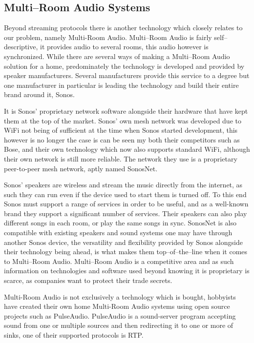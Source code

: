 \subsection{Multi--Room Audio Systems}
Beyond streaming protocols there is another technology which closely relates to our problem, namely Multi-Room Audio.
Multi--Room Audio is fairly self--descriptive, it provides audio to several rooms, this audio however is synchronized.
While there are several ways of making a Multi--Room Audio solution for a home, predominately the technology is developed and provided by speaker manufacturers.
Several manufacturers provide this service to a degree but one manufacturer in particular is leading the technology and build their entire brand around it, Sonos.

It is Sonos' proprietary network software alongside their hardware that have kept them at the top of the market.
Sonos' own mesh network was developed due to WiFi not being of sufficient at the time when Sonos started development, this however is no longer the case is can be seen my both their competitors such as Bose, and their own technology which now also supports standard WiFi, although their own network is still more reliable.\cite{sonos1} %
The network they use is a proprietary peer-to-peer mesh network, aptly named SonosNet.\cite{sonosWiki} %

Sonos' speakers are wireless and stream the music directly from the internet, as such they can run even if the device used to start them is turned off.
To this end Sonos must support a range of services in order to be useful, and as a well-known brand they support a significant number of services.
Their speakers can also play different songs in each room, or play the same songs in sync.
SonosNet is also compatible with existing speakers and sound systems one may have through another Sonos device, the versatility and flexibility provided by Sonos alongside their technology being ahead, is what makes them top--of--the--line when it comes to Multi--Room Audio.\cite{sonos2}
Multi--Room Audio is a competitive area and as such information on technologies and software used beyond knowing it is proprietary is scarce, as companies want to protect their trade secrets.

Multi-Room Audio is not exclusively a technology which is bought, hobbyists have created their own home Multi-Room Audio systems using open source projects such as PulseAudio.\cite{pulseAudioHobbyist}
PulseAudio is a sound-server program accepting sound from one or multiple sources and then redirecting it to one or more of sinks, one of their supported protocols is \ac{RTP}.\cite{pulseAudioModules}


